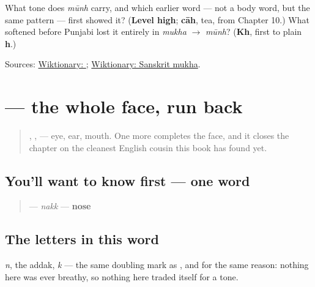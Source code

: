 \begin{tcolorbox}[breakable,colback=teal!4,colframe=teal!35!black,title={Before you move on}]
What tone does \emph{mūnh} carry, and which earlier word — not a body word, but the same pattern — first showed it? (\textbf{Level high}; \textbf{cāh}, tea, from Chapter 10.) What softened before Punjabi lost it entirely in \emph{mukha} $\to$ \emph{mūnh}? (\textbf{Kh}, first to plain \textbf{h}.)

Sources: \href{https://en.wiktionary.org/wiki/\%E0\%A8\%AE\%E0\%A9\%82\%E0\%A9\%B0\%E0\%A8\%B9}{Wiktionary: }; \href{https://en.wiktionary.org/wiki/\%E0\%A4\%AE\%E0\%A5\%81\%E0\%A4\%96}{Wiktionary: Sanskrit mukha}.
\end{tcolorbox}
\section[\texorpdfstring{\pa{ਨੱਕ} (nakk)}{ਨੱਕ (nakk)}]{ — the whole face, run back}

\label{lesson:PA-C12-nakk}



\begin{quote}
\textbf{}, \textbf{}, \textbf{} — eye, ear, mouth. One more completes the face, and it closes the chapter on the cleanest English cousin this book has found yet.
\end{quote}

\subsection*{You'll want to know first — one word}
\begin{quote}
\textbf{} — \emph{nakk} — \textbf{nose}
\end{quote}

\subsection*{The letters in this word}
\textbf{} \emph{n}, \textbf{} the addak, \textbf{} \emph{k} — the same doubling mark as \textbf{}, and for the same reason: nothing here was ever breathy, so nothing here traded itself for a tone.

